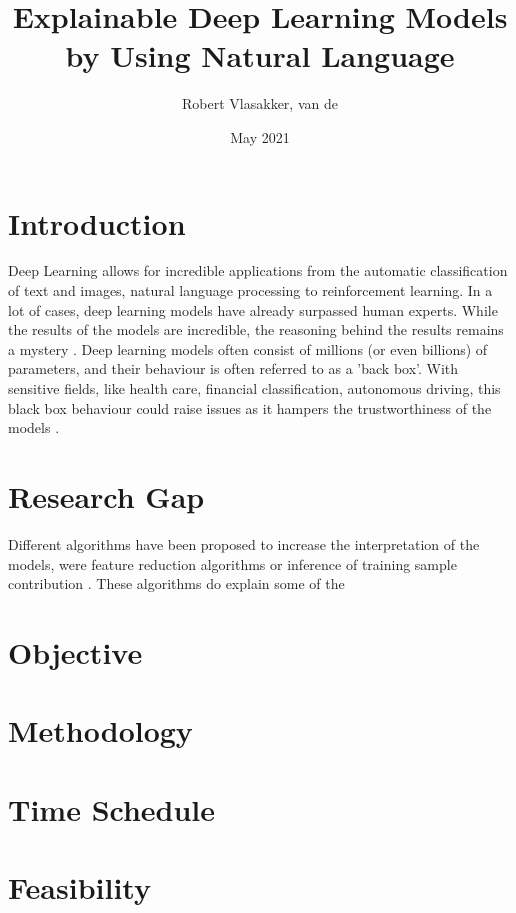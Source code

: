 \documentclass{article}
\title{Explainable Deep Learning Models by Using Natural Language}
\author{Robert Vlasakker, van de}
\date{May 2021}
\begin{document}
\maketitle

\section{Introduction}

Deep Learning allows for incredible applications from the automatic classification of text and images, natural language processing to reinforcement learning.
In a lot of cases, deep learning models have already surpassed human experts.
While the results of the models are incredible, the reasoning behind the results remains a mystery \cite{li_interpretable_2021}.
Deep learning models often consist of millions (or even billions) of parameters, and their behaviour is often referred to as a 'back box'.
With sensitive fields, like health care, financial classification, autonomous driving, this black box behaviour could raise issues as it hampers the trustworthiness of the models \cite{carvalho_machine_2019}.





\section{Research Gap}

Different algorithms have been proposed to increase the interpretation of the models, were feature reduction algorithms \cite{ribeiro_why_2016} or inference of training sample contribution \cite{koh_understanding_2020}.
These algorithms do explain some of the 

\section{Objective}
\section{Methodology}
\section{Time Schedule}
\section{Feasibility}

\printbibliography
\end{document}
